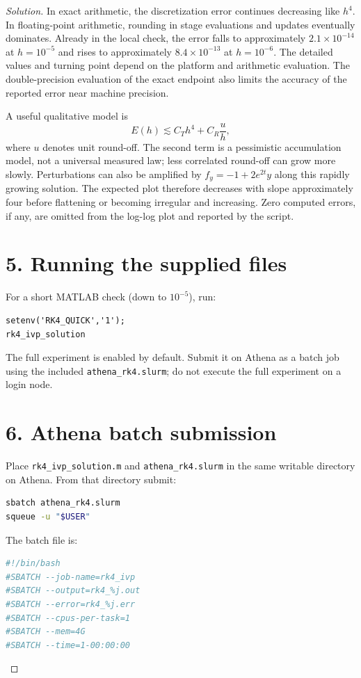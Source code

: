 \documentclass[12pt]{amsart}
\newenvironment{solution}
{\begin{proof}[Solution]}
{\end{proof}}
\begin{document}
\begin{onehalfspace}
\begin{solution}
            In exact arithmetic, the discretization error continues decreasing like
            $h^4$. In floating-point arithmetic, rounding in stage evaluations and
            updates eventually dominates. Already in the local check, the error
            falls to approximately $2.1\times10^{-14}$ at $h=10^{-5}$ and rises to
            approximately $8.4\times10^{-13}$ at $h=10^{-6}$. The detailed values
            and turning point depend on the platform and arithmetic evaluation.
            The double-precision evaluation of the exact endpoint also limits the
            accuracy of the reported error near machine precision.

            A useful qualitative model is
            \[
                E(h)\lesssim C_T h^4+C_R\frac{u}{h},
            \]
            where $u$ denotes unit round-off. The second term is a pessimistic
            accumulation model, not a universal measured law; less correlated
            round-off can grow more slowly. Perturbations can also be amplified by
            $f_y=-1+2e^{2t}y$ along this rapidly growing solution. The expected plot
            therefore decreases with slope approximately four before flattening or
            becoming irregular and increasing. Zero computed errors, if any, are
            omitted from the log-log plot and reported by the script.

            \section*{5. Running the supplied files}
            For a short MATLAB check (down to $10^{-5}$), run:
            \begin{lstlisting}
setenv('RK4_QUICK','1');
rk4_ivp_solution
            \end{lstlisting}
            The full experiment is enabled by default. Submit it on Athena as a
            batch job using the included \texttt{athena\_rk4.slurm}; do not execute
            the full experiment on a login node.

            \section*{6. Athena batch submission}
            Place \texttt{rk4\_ivp\_solution.m} and \texttt{athena\_rk4.slurm}
            in the same writable directory on Athena. From that directory submit:
            \begin{lstlisting}[language=bash]
sbatch athena_rk4.slurm
squeue -u "$USER"
            \end{lstlisting}
            The batch file is:
            \begin{lstlisting}[language=bash]
#!/bin/bash
#SBATCH --job-name=rk4_ivp
#SBATCH --output=rk4_%j.out
#SBATCH --error=rk4_%j.err
#SBATCH --cpus-per-task=1
#SBATCH --mem=4G
#SBATCH --time=1-00:00:00


\end{lstlisting}
\end{solution}
\end{onehalfspace}
\end{document}
